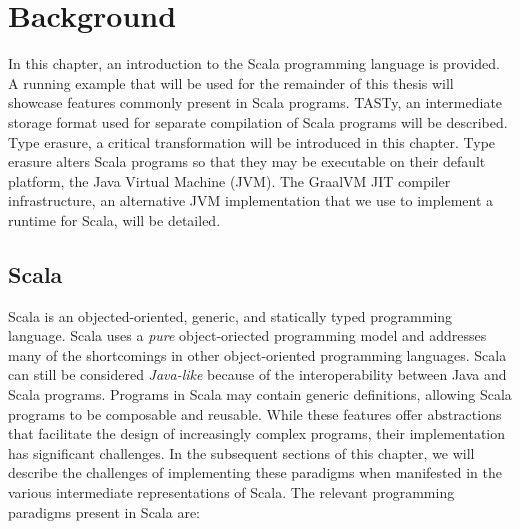 \chapter{Background}

In this chapter,  an introduction to the Scala programming language is provided. 
A running example that will be used for the remainder of this thesis will showcase features commonly present in Scala programs. 
TASTy, an intermediate storage format used for separate compilation of Scala programs will be described. 
Type erasure, a critical transformation will be introduced in this chapter. 
Type erasure alters Scala programs so that they may be executable on their default platform, the Java Virtual Machine (JVM). 
The GraalVM JIT compiler infrastructure, an alternative JVM implementation that we use to implement a runtime for Scala, will be detailed.

\section{Scala}

Scala\cite{scala:overview} is an objected-oriented, generic, and statically typed programming language.
Scala uses a \textit{pure} object-oriected programming model\cite{smalltalk:design} and addresses many of the shortcomings\cite{go4:design-patterns} in other object-oriented programming languages.
Scala can still be considered \textit{Java-like} because of the interoperability between Java and Scala programs.
Programs in Scala may contain generic definitions, allowing Scala programs to be composable and reusable\cite{scala:origins}.
While these features offer abstractions that facilitate the design of increasingly complex programs, their implementation has significant challenges.
In the subsequent sections of this chapter, we will describe the challenges of implementing these paradigms when manifested in the various intermediate representations of Scala.
The relevant programming paradigms present in Scala are:

